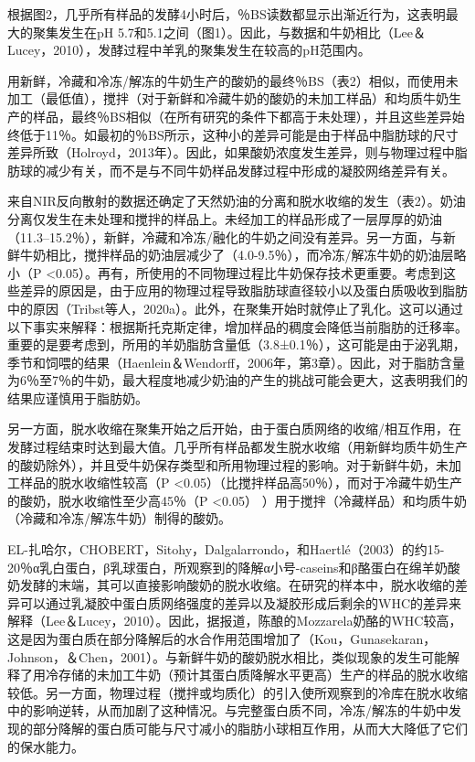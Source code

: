 \documentclass[twocolumn]{ctexart}
\begin{document}
根据图2，几乎所有样品的发酵4小时后，％BS读数都显示出渐近行为，这表明最大的聚集发生在pH 5.7和5.1之间（图1）。因此，与数据和牛奶相比（Lee＆Lucey，2010），发酵过程中羊乳的聚集发生在较高的pH范围内。

用新鲜，冷藏和冷冻/解冻的牛奶生产的酸奶的最终％BS（表2）相似，而使用未加工（最低值），搅拌（对于新鲜和冷藏牛奶的酸奶的未加工样品）和均质牛奶生产的样品，最终％BS相似（在所有研究的条件下都高于未处理），并且这些差异始终低于11％。如最初的％BS所示，这种小的差异可能是由于样品中脂肪球的尺寸差异所致（Holroyd，2013年）。因此，如果酸奶浓度发生差异，则与物理过程中脂肪球的减少有关，而不是与不同牛奶样品发酵过程中形成的凝胶网络差异有关。

来自NIR反向散射的数据还确定了天然奶油的分离和脱水收缩的发生（表2）。奶油分离仅发生在未处理和搅拌的样品上。未经加工的样品形成了一层厚厚的奶油（11.3–15.2％），新鲜，冷藏和冷冻/融化的牛奶之间没有差异。另一方面，与新鲜牛奶相比，搅拌样品的奶油层减少了（4.0-9.5％），而冷冻/解冻牛奶的奶油层略小（P <0.05）。再有，所使用的不同物理过程比牛奶保存技术更重要。考虑到这些差异的原因是，由于应用的物理过程导致脂肪球直径较小以及蛋白质吸收到脂肪中的原因（Tribst等人，2020a）。此外，在聚集开始时就停止了乳化。这可以通过以下事实来解释：根据斯托克斯定律，增加样品的稠度会降低当前脂肪的迁移率。重要的是要考虑到，所用的羊奶脂肪含量低（3.8±0.1％），这可能是由于泌乳期，季节和饲喂的结果（Haenlein＆Wendorff，2006年，第3章）。因此，对于脂肪含量为6％至7％的牛奶，最大程度地减少奶油的产生的挑战可能会更大，这表明我们的结果应谨慎用于脂肪奶。

另一方面，脱水收缩在聚集开始之后开始，由于蛋白质网络的收缩/相互作用，在发酵过程结束时达到最大值。几乎所有样品都发生脱水收缩（用新鲜均质牛奶生产的酸奶除外），并且受牛奶保存类型和所用物理过程的影响。对于新鲜牛奶，未加工样品的脱水收缩性较高（P <0.05）（比搅拌样品高50％），而对于冷藏牛奶生产的酸奶，脱水收缩性至少高45％（P <0.05） ）用于搅拌（冷藏样品）和均质牛奶（冷藏和冷冻/解冻牛奶）制得的酸奶。

EL-扎哈尔，CHOBERT，Sitohy，Dalgalarrondo，和Haertlé（2003）的约15-20％α乳白蛋白，β乳球蛋白，所观察到的降解α小号-caseins和β酪蛋白在绵羊奶酸奶发酵的末端，其可以直接影响酸奶的脱水收缩。在研究的样本中，脱水收缩的差异可以通过乳凝胶中蛋白质网络强度的差异以及凝胶形成后剩余的WHC的差异来解释（Lee＆Lucey，2010）。因此，据报道，陈酿的Mozzarela奶酪的WHC较高，这是因为蛋白质在部分降解后的水合作用范围增加了（Kou，Gunasekaran，Johnson，＆Chen，2001）。与新鲜牛奶的酸奶脱水相比，类似现象的发生可能解释了用冷存储的未加工牛奶（预计其蛋白质降解水平更高）生产的样品的脱水收缩较低。另一方面，物理过程（搅拌或均质化）的引入使所观察到的冷库在脱水收缩中的影响逆转，从而加剧了这种情况。与完整蛋白质不同，冷冻/解冻的牛奶中发现的部分降解的蛋白质可能与尺寸减小的脂肪小球相互作用，从而大大降低了它们的保水能力。
\end{document}
